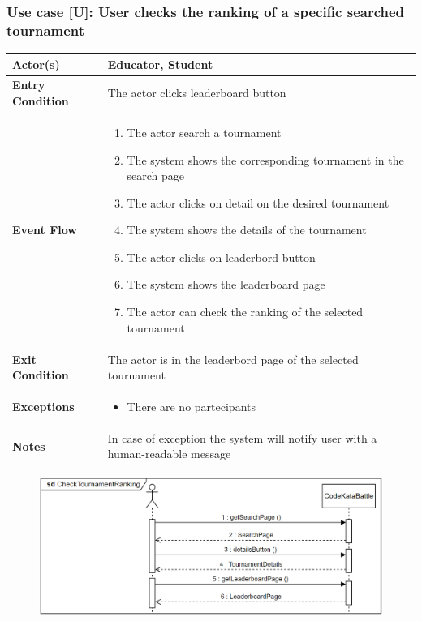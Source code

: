 \documentclass[12pt, a4paper]{report}
\newcounter{useCase}
\newcommand{\usecase}[9]{
    \def\arraystretch{1.5} 
    \subsubsection*{Use case [U#2]: #3}
    \vspace*{0.2cm}
    \begin{center}
        \begin{tabular}{|l|p{12cm}|}
            \hline
            \textbf{Actor(s)} & #4 \\
            \hline
            \textbf{Entry Condition} & #5 \\
            \hline
            \textbf{Event Flow} & #6 \\
            \hline
            \textbf{Exit Condition} & #7 \\
            \hline
            \textbf{Exceptions} & #8 \\
            \hline
            \textbf{Notes} & #9 \\
            \hline
        \end{tabular}
    \end{center}
    #1
}
\begin{document}
        \usecase{\begin{figure}[H]\centering\includegraphics[width=0.9\linewidth]{images/checktournamentranking1.png}\end{figure}}        
        {\arabic{useCase}\stepcounter{useCase}}
        {User checks the ranking of a specific searched tournament}
        {Educator, Student}
        {The actor clicks leaderboard button}
        {
        \begin{enumerate}
            \item The actor search a tournament
            \item The system shows the corresponding tournament in the search page
            \item The actor clicks on detail on the desired tournament
            \item The system shows the details of the tournament 
            \item The actor clicks on leaderbord button
            \item The system shows the leaderboard page
            \item The actor can check the ranking of the selected tournament
        \end{enumerate}
        }
        {The actor is in the leaderbord page of the selected tournament}
        {
        \begin{itemize}
            \item There are no partecipants
        \end{itemize}
        }
        {In case of exception the system will notify user with a human-readable message}
\end{document}
